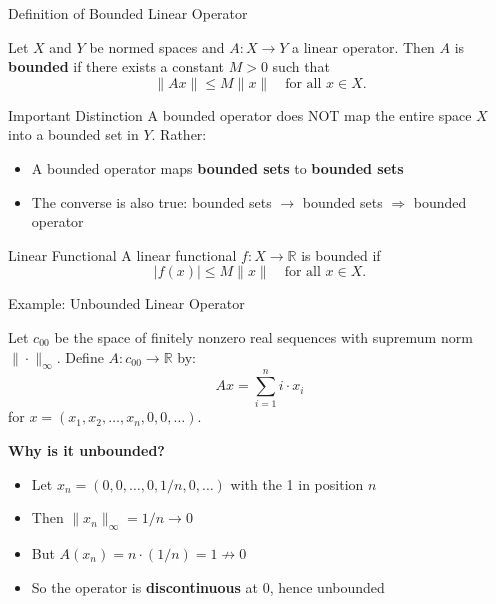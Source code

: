 \documentclass[aspectratio=169,10pt]{beamer}
\begin{document}
\begin{frame}{Definition of Bounded Linear Operator}
    \begin{definition}
        Let $X$ and $Y$ be normed spaces and $A : X \to Y$ a linear operator. Then $A$ is \textbf{bounded} if there exists a constant $M > 0$ such that
        $$\|Ax\| \leq M\|x\| \quad \text{for all } x \in X.$$
    \end{definition}

    \vspace{0.5cm}

    \begin{block}{Important Distinction}
        A bounded operator does NOT map the entire space $X$ into a bounded set in $Y$. Rather:
        \begin{itemize}
            \item A bounded operator maps \textbf{bounded sets} to \textbf{bounded sets}
            \item The converse is also true: bounded sets $\to$ bounded sets $\Rightarrow$ bounded operator
        \end{itemize}
    \end{block}

    \vspace{0.3cm}

    \begin{block}{Linear Functional}
        A linear functional $f : X \to \mathbb{R}$ is bounded if
        $$|f(x)| \leq M\|x\| \quad \text{for all } x \in X.$$
    \end{block}
\end{frame}

\begin{frame}[fragile]{Example: Unbounded Linear Operator}
    \begin{example}
        Let $c_{00}$ be the space of finitely nonzero real sequences with supremum norm $\|\cdot\|_\infty$. Define $A : c_{00} \to \mathbb{R}$ by:
        $$Ax = \sum_{i=1}^{n} i \cdot x_i$$
        for $x = (x_1, x_2, \ldots, x_n, 0, 0, \ldots)$.
    \end{example}

    \vspace{0.3cm}

    \textbf{Why is it unbounded?}
    \begin{itemize}
        \item Let $x_n = (0, 0, \ldots, 0, 1/n, 0, \ldots)$ with the 1 in position $n$
        \item Then $\|x_n\|_\infty = 1/n \to 0$
        \item But $A(x_n) = n \cdot (1/n) = 1 \not\to 0$
        \item So the operator is \textbf{discontinuous} at 0, hence unbounded
    \end{itemize}
\end{frame}
\end{document}
